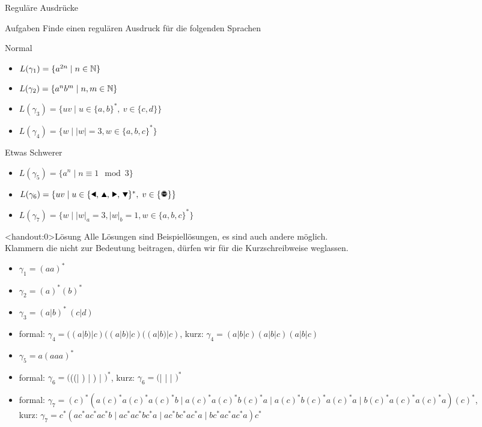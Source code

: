 {
\begin{frame}{Reguläre Ausdrücke}
    \begin{alertblock}{Aufgaben}
        Finde einen regulären Ausdruck für die folgenden Sprachen
    \end{alertblock}
    \begin{block}{Normal}
        \begin{itemize}
            \item $L(\gamma_1) = \{a^{2n} \mid n\in\mathbb{N}\}$
            \item $L(\gamma_2) = \{a^nb^m \mid n, m\in\mathbb{N}\}$
            \item $L(\gamma_3) = \{uv \mid u\in\{a,b\}^\ast,\ v\in\{c,d\}\}$
            \item $L(\gamma_4) = \{w \mid |w| = 3, w\in \{a,b,c\}^*\}$
        \end{itemize}
    \end{block}
    \begin{block}{Etwas Schwerer}
        \begin{itemize}
            \item $L(\gamma_5) = \{a^n \mid n \equiv 1 \mod 3\}$
            \item $L(\gamma_6) = \{uv\mid u\in\{\text{\Rewind, \MoveUp, \Forward, \MoveDown}\}^\ast,\;v\in\{\text{\Stopsign}\}\}$
            \item $L(\gamma_7) = \{w \mid |w|_a = 3, |w|_b = 1, w\in \{a,b,c\}^*\}$
        \end{itemize}
    \end{block}
\end{frame}
}

{
\begin{frame}<handout:0>{Lösung}
    Alle Lösungen sind Beispiellösungen, es sind auch andere möglich.\\
    Klammern die nicht zur Bedeutung beitragen, dürfen wir für die Kurzschreibweise weglassen.
    \begin{itemize}[<+- | alert@+>]
        \item $\gamma_1 = (aa)^*$
        \item $\gamma_2 = (a)^*(b)^*$
        \item $\gamma_3 = (a|b)^*\ (c|d)$
        \item formal: $\gamma_4 = ((a|b)|c)((a|b)|c)((a|b)|c)$, kurz: $\gamma_4 = (a|b|c)(a|b|c)(a|b|c)$
        \item $\gamma_5 = a(aaa)^*$
        \item formal: $\gamma_6 = ($((\Rewind | \MoveUp) | \Forward) | \MoveDown$)^*$\Stopsign, kurz: $\gamma_6 = ($\Rewind | \MoveUp | \Forward | \MoveDown$)^*$\Stopsign
        \item formal: $\gamma_7 = (c)^*(a(c)^*a(c)^*a(c)^*b\mid a(c)^*a(c)^*b(c)^*a\mid a(c)^*b(c)^*a(c)^*a\mid b(c)^*a(c)^*a(c)^*a)(c)^*$,\\kurz: $\gamma_7 = c^*(ac^*ac^*ac^*b\mid ac^*ac^*bc^*a\mid ac^*bc^*ac^*a\mid bc^*ac^*ac^*a)c^*$
    \end{itemize}
\end{frame}
}

